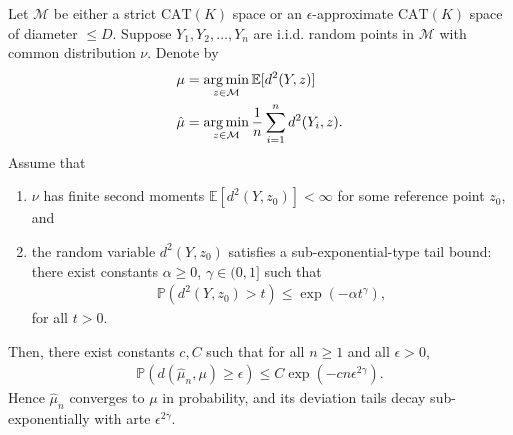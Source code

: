 \begin{proposition}
    \label{prp:tail_bound_frechet_mean}
    Let $\mathcal{M}$ be either a strict $\mathrm{CAT}(K)$ space or an $\epsilon$-approximate $\mathrm{CAT}(K)$ space of diameter $\leq D$.
    Suppose $Y_1,Y_2,\dots,Y_n$ are i.i.d. random points in $\mathcal{M}$ with common distribution $\nu$.
    Denote by
    \begin{align*}
        \mu &= \operatorname*{arg\,min}_{z \in \mathcal{M}}\mathbb{E}[d^2(Y, z)] \\
        \hat{\mu} &= \operatorname*{arg\,min}_{z \in \mathcal{M}}\frac{1}{n}\sum^n_{i=1}d^2(Y_i, z).
    \end{align*}
    Assume that
    \begin{enumerate}
        \item $\nu$ has finite second moments $\mathbb{E}[d^2(Y, z_0)] < \infty$ for some reference point $z_0$, and
        \item the random variable $d^2(Y, z_0)$ satisfies a sub-exponential-type tail bound: there exist constants $\alpha \geq 0$, $\gamma \in (0, 1]$ such that
        \begin{align}
            \mathbb{P}\left(d^2(Y, z_0) > t\right) \leq \exp(-\alpha t^\gamma),
        \end{align}
        for all $t > 0$.
    \end{enumerate}
    Then, there exist constants $c, C$ such that for all $n \geq 1$ and all $\epsilon > 0$,
    \begin{align}
        \mathbb{P}\left(d(\hat{\mu}_n, \mu) \geq \epsilon \right) \leq C \exp\left(-cn \epsilon^{2\gamma} \right).
    \end{align}
    Hence $\hat{\mu}_n$ converges to $\mu$ in probability, and its deviation tails decay sub-exponentially with arte $\epsilon^{2\gamma}$.
\end{proposition}
